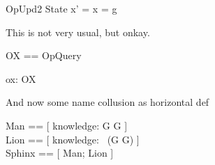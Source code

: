 \documentclass{article}
\begin{document}
\begin{schema}{OpUpd2}
   \Delta State
\where
    x' = x = g \\
\end{schema}

This is not very usual, but onkay.
\begin{zed}
   OX == \pre OpQuery
\end{zed}

\begin{axdef}
   ox: OX
\end{axdef}

And now some name collusion as horizontal def
\begin{zed} 
   Man  == [ knowledge: G \fun G ] \\
   Lion == [ knowledge: \power~(G \cross G) ] \\
   Sphinx == [ Man; Lion ]
\end{zed}
\end{document}

